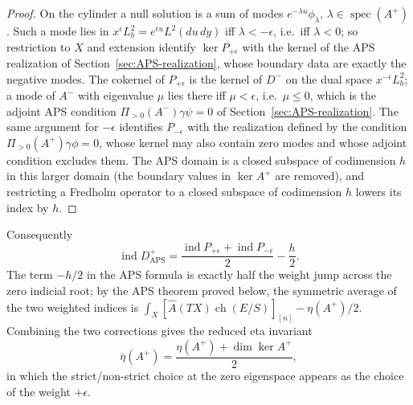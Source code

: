 \documentclass[12pt,oneside,reqno]{article}
\theoremstyle{plain}
\theoremstyle{definition}
\theoremstyle{remark}
\begin{document}
\begin{proof}
On the cylinder a null solution is a sum of modes
\(e^{-\lambda u}\phi_\lambda\), \(\lambda\in\operatorname{spec}(A^+)\).
Such a mode lies in \(x^{\epsilon}L_b^2=e^{\epsilon u}L^2(du\,dy)\) iff
\(\lambda<-\epsilon\), i.e.\ iff \(\lambda<0\); so restriction to \(X\) and
extension identify \(\ker P_{+\epsilon}\) with the kernel of the APS
realization of Section~\ref{sec:APS-realization}, whose boundary data are
exactly the negative modes. The cokernel of \(P_{+\epsilon}\) is the kernel
of \(D^-\) on the dual space \(x^{-\epsilon}L_b^2\); a mode of \(A^-\) with
eigenvalue \(\mu\) lies there iff \(\mu<\epsilon\), i.e.\ \(\mu\leq0\), which
is the adjoint APS condition \(\Pi_{>0}(A^-)\gamma\psi=0\) of
Section~\ref{sec:APS-realization}. The same argument for \(-\epsilon\)
identifies \(P_{-\epsilon}\) with the realization defined by the condition
\(\Pi_{>0}(A^+)\gamma\phi=0\), whose kernel may also contain zero modes and
whose adjoint condition excludes them. The APS domain is a closed
subspace of codimension \(h\) in this larger domain (the boundary values
in \(\ker A^+\) are removed), and restricting a Fredholm operator to a
closed subspace of codimension \(h\) lowers its index by \(h\).
\end{proof}

Consequently
\[
 \operatorname{ind}D^+_{\mathrm{APS}}
 =\frac{\operatorname{ind}P_{+\epsilon}+\operatorname{ind}P_{-\epsilon}}2
 -\frac h2 .
\]
The term \(-h/2\) in the APS formula is exactly half the weight jump across
the zero indicial root; by the APS theorem proved below, the symmetric
average of the two weighted indices is \(\int_X[\widehat A(TX)\operatorname{ch}(E/S)]_{[n]}-\eta(A^+)/2\).
Combining the two corrections gives the reduced eta invariant
\[
 \bar\eta(A^+)
 =\frac{\eta(A^+)+\dim\ker A^+}2 ,
\]
in which the strict/non-strict choice at the zero eigenspace appears as
the choice of the weight \(+\epsilon\).
\end{document}
